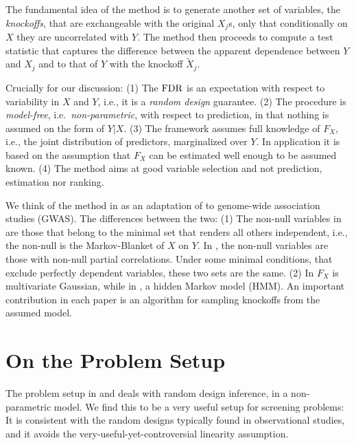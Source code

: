 \documentclass[article,lineno]{biometrika}
\begin{document}
	The fundamental idea of the method is to generate another set of variables, the \emph{knockoffs}, that are exchangeable with the original $X_j$s, only that  conditionally on $X$ they are uncorrelated with $Y$.
	The method then proceeds to compute a test statistic that captures the difference between the apparent dependence between $Y$ and $X_j$ and to that of $Y$ with the knockoff $\tilde X_j$.
	
	Crucially for our discussion:
	(1) The $\rm{FDR}$ is an expectation with respect to variability in $X$ and $Y$, i.e., it is a \emph{random design} guarantee.
	(2) The procedure is \emph{model-free}, i.e.\ \emph{non-parametric}, with respect to prediction, in that nothing is assumed on the form of $Y|X$.
	(3) The framework assumes full knowledge of $F_X$, i.e., the joint distribution of predictors, marginalized over $Y$. In application it is based on the assumption that $F_X$ can be estimated well enough to be assumed known.
	(4) The method aims at good variable selection and not prediction, estimation nor ranking.
	
	We think of the method in \cite{SesiaGenehuntinghidden} as an adaptation of \cite{CandesPanninggoldmodelX2018} to genome-wide association studies (GWAS).
	The differences between the two:
	(1) The non-null variables in \cite{CandesPanninggoldmodelX2018} are those that belong to the minimal set that renders all others independent, i.e., the non-null is the Markov-Blanket of $X$ on $Y$.
	In \cite{SesiaGenehuntinghidden}, the non-null variables are those with non-null partial correlations. 
	Under some minimal conditions, that exclude perfectly dependent variables, these two sets are the same.
	(2) In \cite{CandesPanninggoldmodelX2018} $F_X$ is multivariate Gaussian, while in \cite{SesiaGenehuntinghidden}, a hidden Markov model (HMM).
	An important contribution in each paper is an algorithm for sampling knockoffs from the assumed model.
	
	
	
	\section{On the Problem Setup}
	
	The problem setup in \cite{CandesPanninggoldmodelX2018} and \cite{SesiaGenehuntinghidden} deals with random design inference, in a non-parametric model.
	We find this to be a very useful setup for screening problems:
	It is consistent with the random designs typically found in observational studies, and it avoids the very-useful-yet-controversial linearity assumption.
	
\end{document}
